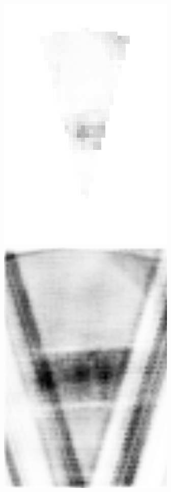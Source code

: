 \begin{figure}[!t]
{		\includegraphics[height=0.2\textheight]{chapters/images/proposals/unseen/heatmap-wrench-gray.jpg}
		\includegraphics[height=0.2\textheight]{chapters/images/proposals/unseen/wrench-fcn.jpg}
	}


\end{figure}
